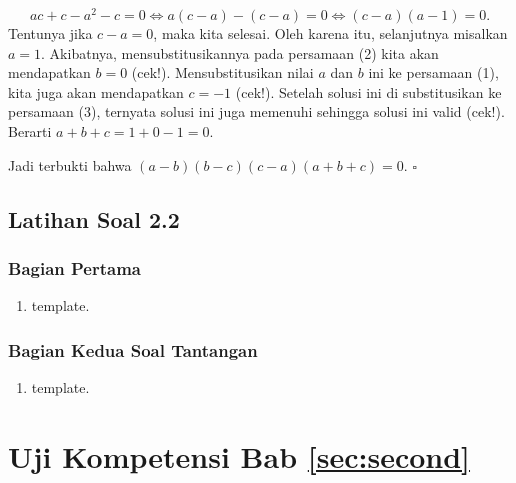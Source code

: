 \begin{jawab}
		\[ ac + c - a^{2} - c = 0 \iff a\left(c - a\right) - \left(c - a\right) = 0 \iff \left(c - a\right)\left(a - 1\right) = 0. \]
		Tentunya jika $ c - a = 0 $, maka kita selesai. Oleh karena itu, selanjutnya misalkan $ a = 1 $. Akibatnya, mensubstitusikannya pada persamaan (2) kita akan mendapatkan $ b = 0 $ (cek!). Mensubstitusikan nilai $ a $ dan $ b $ ini ke persamaan (1), kita juga akan mendapatkan $ c = -1 $ (cek!). Setelah solusi ini di substitusikan ke persamaan (3), ternyata solusi ini juga memenuhi sehingga solusi ini valid (cek!). Berarti $ a + b + c = 1 + 0 - 1 = 0 $.
		\par Jadi terbukti bahwa $ \left(a - b\right)\left(b - c\right)\left(c - a\right)\left(a + b + c\right) = 0 $. \hfill $ \square $
	\end{jawab}
	
\newpage

\subsection{Latihan Soal 2.2}
	
	\subsubsection{Bagian Pertama}
		
		\begin{enumerate}[nosep]
			\item template.
		\end{enumerate}
	
	\subsubsection{Bagian Kedua \dashh Soal Tantangan}
		
		\begin{enumerate}[nosep]
			\item template.
		\end{enumerate}

\newpage


\section{Uji Kompetensi Bab \ref{sec:second}}

\kant[6-10]